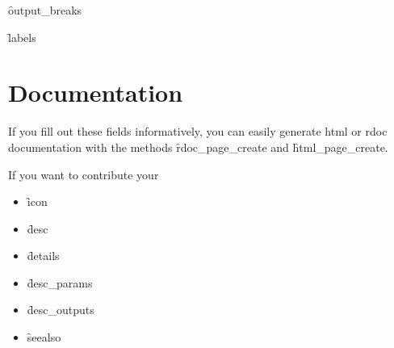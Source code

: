 \f{output_breaks}

\f{labels}

\section{Documentation}
\label{sec:documentation}

If you fill out these fields informatively, you can easily generate html or rdoc documentation with the methods \f{rdoc_page_create} and \f{html_page_create}.

If you want to contribute your

\begin{itemize}
  \item \f{icon}
  \item \f{desc}
  \item \f{details}
  \item \f{desc_params}
  \item \f{desc_outputs}
  \item \f{seealso}
\end{itemize}


